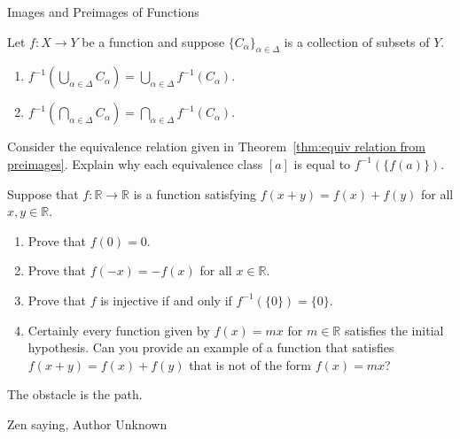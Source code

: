 \begin{section}{Images and Preimages of Functions}
\begin{theorem}\label{thm:unions and intersections of preimages}
Let $f:X\to Y$ be a function and suppose $\{C_{\alpha}\}_{\alpha\in\Delta}$ is a collection of subsets of $Y$.
\begin{enumerate}[label=\textrm{(\alph*)}]
\item $\displaystyle f^{-1}\left(\bigcup_{\alpha\in\Delta} C_{\alpha}\right)=\bigcup_{\alpha\in\Delta} f^{-1}\left(C_{\alpha}\right)$.
\item $\displaystyle f^{-1}\left(\bigcap_{\alpha\in\Delta} C_{\alpha}\right)=\bigcap_{\alpha\in\Delta} f^{-1}\left(C_{\alpha}\right)$.
\end{enumerate}
\end{theorem}

\begin{problem}
Consider the equivalence relation given in Theorem~\ref{thm:equiv relation from preimages}. Explain why each equivalence class $[a]$ is equal to $f^{-1}(\{f(a)\})$.
\end{problem}

\begin{problem}
Suppose that $f: \mathbb{R}\to \mathbb{R}$ is a function satisfying $f(x+y)=f(x)+f(y)$ for all $x,y\in\mathbb{R}$.
\begin{enumerate}[label=\textrm{(\alph*)}]
\item Prove that $f(0)=0$.
\item Prove that $f(-x)=-f(x)$ for all $x\in\mathbb{R}$.
\item Prove that $f$ is injective if and only if $f^{-1}(\{0\})=\{0\}$.
\item Certainly every function given by $f(x)=mx$ for $m\in\mathbb{R}$ satisfies the initial hypothesis. Can you provide an example of a function that satisfies $f(x+y)=f(x)+f(y)$ that is not of the form $f(x)=mx$?
\end{enumerate}
\end{problem}

\epigraph{The obstacle is the path.}{Zen saying, Author Unknown}

\end{section}